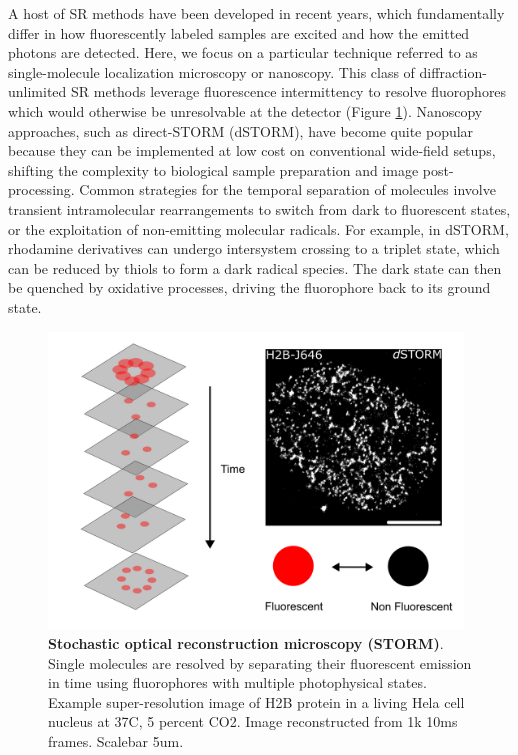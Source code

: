 A host of SR methods have been developed in recent years, which fundamentally differ in how fluorescently labeled samples are excited and how the emitted photons are detected. Here, we focus on a particular technique referred to as single-molecule localization microscopy or nanoscopy. This class of diffraction-unlimited SR methods leverage fluorescence intermittency to resolve fluorophores which would otherwise be unresolvable at the detector (Figure \ref{fig:fig1}). Nanoscopy approaches, such as direct-STORM (dSTORM), have become quite popular because they can be implemented at low cost on conventional wide-field setups, shifting the complexity to biological sample preparation and image post-processing. Common strategies for the temporal separation of molecules involve transient intramolecular rearrangements to switch from dark to fluorescent states, or the exploitation of non-emitting molecular radicals. For example, in dSTORM, rhodamine derivatives can undergo intersystem crossing to a triplet state, which can be reduced by thiols to form a dark radical species. The dark state can then be quenched by oxidative processes, driving the fluorophore back to its ground state. 

\begin{figure}[t]
\centering
\includegraphics[width=11cm]{media/Intro.png}
\caption{\textbf{Stochastic optical reconstruction microscopy (STORM)}. Single molecules are resolved by separating their fluorescent emission in time using fluorophores with multiple photophysical states. Example super-resolution image of H2B protein in a living Hela cell nucleus at 37C, 5 percent CO2. Image reconstructed from 1k 10ms frames. Scalebar 5um.}
\label{fig:fig1}
\end{figure}

